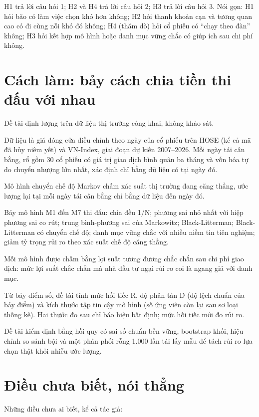 H1 trả lời câu hỏi 1; H2 và H4 trả lời câu hỏi 2; H3 trả lời câu hỏi 3. Nói gọn: H1 hỏi bão có làm việc chọn khó hơn không; H2 hỏi thanh khoản cạn và tương quan cao có đi cùng nỗi khó đó không; H4 (thăm dò) hỏi cổ phiếu có “chạy theo đàn” không; H3 hỏi kết hợp mô hình hoặc danh mục vững chắc có giúp ích sau chi phí không.

\section{Cách làm: bảy cách chia tiền thi đấu với nhau}

Đề tài định lượng trên dữ liệu thị trường công khai, không khảo sát.

Dữ liệu là giá đóng cửa điều chỉnh theo ngày của cổ phiếu trên HOSE (kể cả mã đã hủy niêm yết) và VN-Index, giai đoạn dự kiến 2007--2026. Mỗi ngày tái cân bằng, rổ gồm 30 cổ phiếu có giá trị giao dịch bình quân ba tháng và vốn hóa tự do chuyển nhượng lớn nhất, xác định chỉ bằng dữ liệu có tại ngày đó.

Mô hình chuyển chế độ Markov chấm xác suất thị trường đang căng thẳng, ước lượng lại tại mỗi ngày tái cân bằng chỉ bằng dữ liệu đến ngày đó.

Bảy mô hình M1 đến M7 thi đấu: chia đều 1/N; phương sai nhỏ nhất với hiệp phương sai co rút; trung bình-phương sai của Markowitz; Black-Litterman; Black-Litterman có chuyển chế độ; danh mục vững chắc với nhiều niềm tin tiên nghiệm; giảm tỷ trọng rủi ro theo xác suất chế độ căng thẳng.

Mỗi mô hình được chấm bằng lợi suất tương đương chắc chắn sau chi phí giao dịch: mức lợi suất chắc chắn mà nhà đầu tư ngại rủi ro coi là ngang giá với danh mục.

Từ bảy điểm số, đề tài tính mức hối tiếc R, độ phân tán D (độ lệch chuẩn của bảy điểm) và kích thước tập tin cậy mô hình (số ứng viên còn lại sau sơ loại thống kê). Hai thước đo sau chỉ báo hiệu bất định; mức hối tiếc mới đo rủi ro.

Đề tài kiểm định bằng hồi quy có sai số chuẩn bền vững, bootstrap khối, hiệu chỉnh so sánh bội và một phân phối rỗng 1.000 lần tái lấy mẫu để tách rủi ro lựa chọn thật khỏi nhiễu ước lượng.

\section{Điều chưa biết, nói thẳng}

Những điều chưa ai biết, kể cả tác giả:

